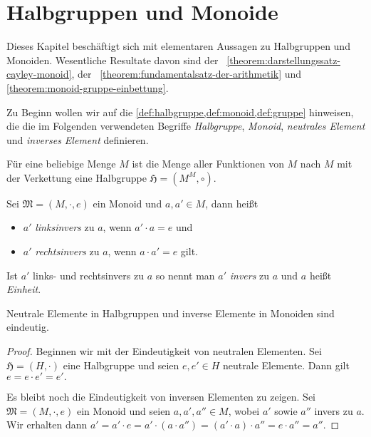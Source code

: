 \section{Halbgruppen und Monoide}
Dieses Kapitel beschäftigt sich mit elementaren Aussagen zu Halbgruppen und Monoiden. Wesentliche Resultate davon sind der ~\ref{theorem:darstellungssatz-cayley-monoid}, der ~\ref{theorem:fundamentalsatz-der-arithmetik} und \cref{theorem:monoid-gruppe-einbettung}.

Zu Beginn wollen wir auf die \cref{def:halbgruppe,def:monoid,def:gruppe} hinweisen, die die im Folgenden verwendeten Begriffe \emph{Halbgruppe}, \emph{Monoid}, \emph{neutrales Element} und \emph{inverses Element} definieren.

\begin{example}
    Für eine beliebige Menge $M$ ist die Menge aller Funktionen von $M$ nach $M$ mit der Verkettung eine Halbgruppe $\mathfrak{H} = (M^M, \circ)$.
\end{example}

\begin{definition}
    Sei $\mathfrak{M} = (M, \cdot, e)$ ein Monoid und $a, a' \in M$, dann heißt
    \begin{itemize}
        \item $a'$ \emph{linksinvers} zu $a$, wenn $a' \cdot a = e$ und
        \item $a'$ \emph{rechtsinvers} zu $a$, wenn $a \cdot a' = e$ gilt.
    \end{itemize}
    Ist $a'$ links- und rechtsinvers zu $a$ so nennt man $a'$ \emph{invers} zu $a$ und $a$ heißt \emph{Einheit}.
\end{definition}

\begin{lemma}
    Neutrale Elemente in Halbgruppen und inverse Elemente in Monoiden sind eindeutig.
\end{lemma}

\begin{proof}
    Beginnen wir mit der Eindeutigkeit von neutralen Elementen. Sei $\mathfrak{H} = (H, \cdot)$ eine Halbgruppe und seien $e, e' \in H$ neutrale Elemente. Dann gilt $e = e \cdot e' = e'.$
    
    Es bleibt noch die Eindeutigkeit von inversen Elementen zu zeigen. Sei $\mathfrak{M} = (M, \cdot, e)$ ein Monoid und seien $a, a', a'' \in M$, wobei $a'$ sowie $a''$ invers zu $a$. Wir erhalten dann $ a' = a' \cdot e = a' \cdot (a \cdot a'') = (a' \cdot a) \cdot a'' = e \cdot a'' = a''.$
\end{proof}

